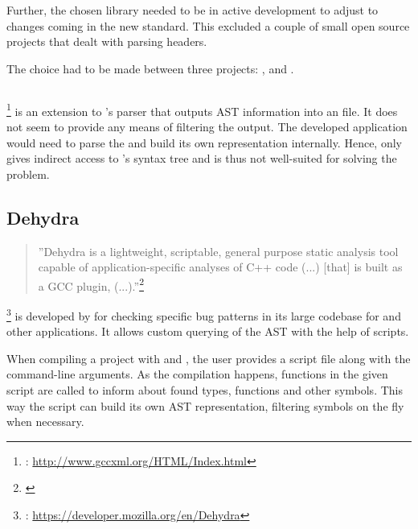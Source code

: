 Further, the chosen library needed to be in active development to adjust to changes coming in the new  standard. This excluded a couple of small open source projects that dealt with parsing  headers.

The choice had to be made between three projects: ,  and .

\subsection{}

\footnote{: \url{http://www.gccxml.org/HTML/Index.html}} is an extension to 's  parser that outputs AST information into an  file. It does not seem to provide any means of filtering the output. The developed application would need to parse the  and build its own representation internally. Hence,  only gives indirect access to 's syntax tree and is thus not well-suited for solving the problem.

\subsection{Dehydra}

\begin{quotation}
''Dehydra is a lightweight, scriptable, general purpose static analysis tool capable of application-specific analyses of C++ code (...) [that] is built as a GCC plugin, (...).''\footnote{\citep{MDNDehydra}}
\end{quotation}

\footnote{: \url{https://developer.mozilla.org/en/Dehydra}} is developed by  for checking specific bug patterns in its large codebase for  and other  applications. It allows custom querying of the AST with the help of  scripts.

When compiling a project with  and , the user provides a script file along with the command-line arguments. As the compilation happens, functions in the given script are called to inform about found types, functions and other symbols. This way the script can build its own AST representation, filtering symbols on the fly when necessary.

